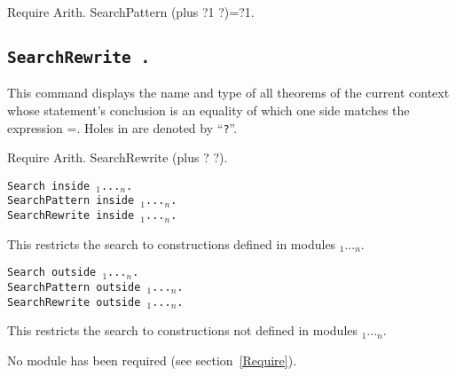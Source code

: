 \begin{coq_example}
Require Arith.
SearchPattern (plus ?1 ?)=?1.
\end{coq_example}

\subsection{\tt SearchRewrite {\term}.}

This command displays the name and type of all theorems of the current
context whose statement's conclusion is an equality of which one side matches
the expression {\term =}. Holes in {\term} are denoted by ``{\texttt ?}''.

\begin{coq_example}
Require Arith.
SearchRewrite (plus ? ?).
\end{coq_example}

\begin{Variants}
\item
{\tt Search {\qualid} inside
{\module$_1$}...{\module$_n$}.}\\
{\tt SearchPattern {\term} inside
{\module$_1$}...{\module$_n$}.}\\
{\tt SearchRewrite {\term} inside
{\module$_1$}...{\module$_n$}.}

This restricts the search to constructions defined in modules {\module$_1$}...{\module$_n$}.

\item {\tt Search {\qualid} outside {\module$_1$}...{\module$_n$}.}\\
{\tt SearchPattern {\term} outside {\module$_1$}...{\module$_n$}.}\\
{\tt SearchRewrite {\term} outside {\module$_1$}...{\module$_n$}.}

  This restricts the search to constructions not defined in modules
{\module$_1$}...{\module$_n$}.

\end{Variants}
\begin{ErrMsgs}
\item {}
No module \module{} has been required (see section~\ref{Require}).
\end{ErrMsgs}



